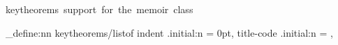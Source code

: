   {keytheorems~support~for~the~memoir~class}

\keys_define:nn { keytheorems/listof }
  {
    indent .initial:n = 0pt,
    title-code .initial:n = %
      { %
         \chapterheadstart
        {\parindent\z@
         \parskip\z@
         \interlinepenalty\@M
         \printchapternonum
         \thispagestyle{chapter}
         \afterchaptertitle
        }
         \@afterheading
      },
  }